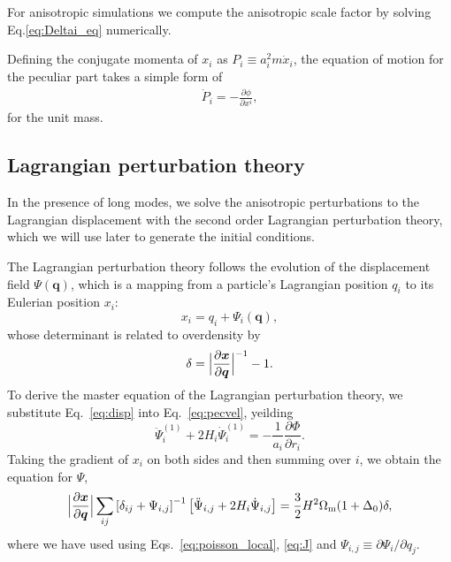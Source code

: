 \documentclass[a4paper,11pt]{article}
\newcommand{\vx}{{\bm x}}
\newcommand{\vq}{{\bm q}}
\begin{document}
For anisotropic simulations we compute the anisotropic scale factor
by solving Eq.\eqref{eq:Deltai_eq} numerically.

Defining the conjugate momenta of $x_{i}$ as $P_{i}\equiv a_i^2 m \dot x_{i}$,
the equation of motion for the peculiar part takes a simple form of
\begin{align}
    \dot P_{i} = - \frac{\partial \phi}{\partial x^i},
    \label{eq:mod_EoM}
\end{align}
for the unit mass.



\subsection{Lagrangian perturbation theory}
\label{sub:lpt}

In the presence of long modes, we solve the anisotropic perturbations to the
Lagrangian displacement with the second order Lagrangian perturbation theory,
which we will use later to generate the initial conditions.

The Lagrangian perturbation theory follows the evolution of the displacement field $\Psi(\vq)$,
which is a mapping from a particle's Lagrangian
position $q_i$ to its Eulerian position $x_i$:
\begin{equation}
    x_i = q_i + \Psi_i({\vq}),
    \label{eq:disp}
\end{equation}
whose determinant is related to overdensity by
\begin{equation}
    \delta = \Bigl| \frac{\partial{\vx}}{\partial{\vq}} \Bigr|^{-1} - 1.
    \label{eq:J}
\end{equation}
To derive the master equation of the Lagrangian perturbation theory,  we substitute Eq.~\eqref{eq:disp} into Eq.~\eqref{eq:pecvel}, yeilding 
\begin{equation}
    \ddot \Psi_i^{(1)} + 2 H_i \dot \Psi_i^{(1)} = - \frac1{a_i}
    \frac{\partial\Phi}{\partial r_i}.
\end{equation}
Taking the gradient of $x_i$ on both sides and then summing over $i$,
we obtain the equation for $\Psi$,
\begin{align}
    \Bigl| \frac{\partial{\vx}}{\partial{\vq}} \Bigr| 
    \sum_{ij}
    \left[\delta_{ij} + \Psi_{i,j}  \right]^{-1}
    \left[ \ddot{\Psi}_{i,j} + 2H_i\dot{\Psi}_{i,j} \right]
    =\frac{3}{2}H^2\Omega_{\rm m}(1+\Delta_0)
    \delta,
    \label{eq:master}
\end{align}
where we have used using Eqs.~\eqref{eq:poisson_local}, \eqref{eq:J} and $\Psi_{i,j} \equiv \partial\Psi_i / \partial q_j$.
\end{document}
